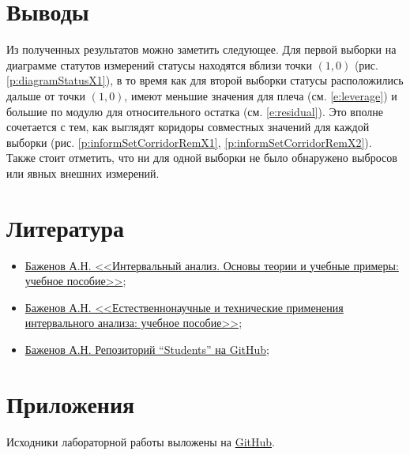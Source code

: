 \documentclass[a4paper,12pt]{article}
\begin{document}
\section{Выводы}
\quad Из полученных результатов можно заметить следующее. Для первой выборки на
диаграмме статутов измерений статусы находятся вблизи точки $ (1, 0) $ (рис.
\ref{p:diagramStatusX1}), в то время как для второй выборки статусы
расположились дальше от точки $ (1, 0) $, имеют меньшие значения для плеча (см.
\ref{e:leverage}) и большие по модулю для относительного остатка (см.
\ref{e:residual}). Это вполне сочетается с тем, как выглядят коридоры совместных
значений для каждой выборки (рис. \ref{p:informSetCorridorRemX1},
\ref{p:informSetCorridorRemX2}). Также стоит отметить, что ни для одной выборки
не было обнаружено выбросов или явных внешних измерений.

\section{Литература}
\begin{itemize}
  \item \href{https://elib.spbstu.ru/dl/2/s20-76.pdf/info}{Баженов А.Н.
    <<Интервальный анализ. Основы теории и учебные примеры: учебное пособие>>};
  \item \href{https://elib.spbstu.ru/dl/5/tr/2021/tr21-169.pdf/info}{Баженов
      А.Н. <<Естественнонаучные и технические применения интервального анализа:
    учебное пособие>>};
  \item \href{https://github.com/AlexanderBazhenov/Students}{Баженов А.Н.
    Репозиторий ``Students'' на GitHub};
\end{itemize}

\section{Приложения}
\quad Исходники лабораторной работы выложены на
\href{https://github.com/MeShootIn/interval-analysis/tree/lab-3}{GitHub}.
\end{document}

